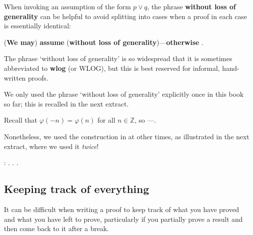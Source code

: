 \begin{vocabulary}
\label{vcbWlog}
When invoking an assumption of the form $p \vee q$, the phrase \textbf{without loss of generality} can be helpful to avoid splitting into cases when a proof in each case is essentially identical:

\begin{vocabtemplate}
(\textbf{We may}) \textbf{assume}  (\textbf{without loss of generality})---\textbf{otherwise} .
\end{vocabtemplate}

The phrase `without loss of generality' is so widespread that it is sometimes abbreviated to \textbf{wlog} (or WLOG), but this is best reserved for informal, hand-written proofs.
\end{vocabulary}

We only used the phrase `without loss of generality' explicitly once in this book so far; this is recalled in the next extract.

\begin{extract}
\label{xtrWlogExample}
Recall that $\varphi(-n) = \varphi(n)$ for all $n \in \mathbb{Z}$, so  ---.
\end{extract}

Nonetheless, we used the construction in  at other times, as illustrated in the next extract, where we used it \textit{twice}!

\begin{extract}
\label{xtrWlogExampleTwo}
: .  . .
\end{extract}

\subsection*{Keeping track of everything}

It can be difficult when writing a proof to keep track of what you have proved and what you have left to prove, particularly if you partially prove a result and then come back to it after a break.

